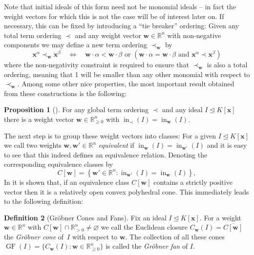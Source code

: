 \documentclass[
  paper=a4,
  titlepage,
  bibliography=totoc,
  pagesize=pdftex
]{scrartcl}
\numberwithin{figure}{section}
\numberwithin{equation}{section}
\numberwithin{table}{section}
\newcommand*\setR{\mathds{R}}
\let\vec\mathbf
\let\idealof\trianglelefteq
\DeclareMathOperator{\initial}{in}
\DeclareMathOperator{\GF}{GF}
\theoremstyle{definition}
\newtheorem{definition}{Definition}
\newtheorem{proposition}[definition]{Proposition}
\numberwithin{definition}{section}
\begin{document}
Note that initial ideals of this form need not be monomial ideals -- in fact the weight
vectors for which this is not the case will be of interest later on. If necessary, this
can be fixed by introducing a \enquote{tie breaker} ordering: Given any total term
ordering $\prec$ and any weight vector $\vec w\in\setR^n$ with non-negative components we
may define a new term ordering $\prec_{\vec w}$ by
\[
  \vec x^\alpha \prec_{\vec w} \vec x^\beta
  \quad\iff\quad
  \vec w \cdot \alpha < \vec w\cdot \beta
  \text{ or }
  \left(
    \vec w \cdot \alpha = \vec w\cdot \beta
    \text{ and }
    \vec x^\alpha \prec \vec x^\beta
  \right)
\]
where the non-negativity constraint is required to ensure that $\prec_{\vec w}$ is also a
total ordering, meaning that 1 will be smaller than any other monomial with respect to
$\prec_{\vec w}$. Among some other nice properties, the most important result obtained
from these constructions is the following:

\begin{proposition}[{\cite[Proposition~1.11]{SturmGBCP}}]
  \label{prp:init}
  For any global term ordering $\prec$ and any ideal $I \idealof K[\vec x]$ there is a
  weight vector $\vec w \in \setR^n_{\geq0}$ with $\initial_\prec(I) = \initial_{\vec
  w}(I)$.
\end{proposition}

The next step is to group these weight vectors into classes: For a given $I \idealof
K[\vec x]$ we call two weights $\vec w, \vec w' \in \setR^n$ \emph{equivalent} if
$\initial_{\vec w}(I) = \initial_{\vec w'}(I)$ and it is easy to see that this indeed
defines an equivalence relation. Denoting the corresponding equivalence classes by
\[
  C[\vec w] = \left\{
    \vec w' \in \setR^n : \initial_{\vec w'}(I) = \initial_{\vec w}(I)
  \right\},
\]
In \cite[Section~2]{compGrobFan} it is shown that, if an equivalence class $C[\vec w]$
contains a strictly positive vector then it is a relatively open convex polyhedral cone.
This immediately leads to the following definition:

\begin{definition}[Gröbner Cones and Fans]
  \label{def:groebnerConeFan}
  Fix an ideal $I \idealof K[\vec x]$. For a weight $\vec w \in \setR^n$ with $C[\vec w]
  \cap \setR^n_{>0} \neq \varnothing$ we call the Euclidean closure $C_{\vec w}(I) =
  \overline{C[\vec w]}$ the \emph{Gröbner cone} of~$I$ with respect to $\vec w$. The
  collection of all these cones $\GF(I) = \{ C_{\vec w}(I) : \vec w \in \setR^n_{\geq0}
  \}$ is called the \emph{Gröbner fan} of $I$.
\end{definition}
\end{document}
